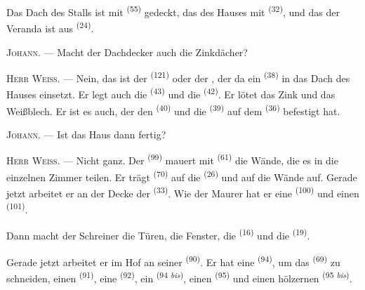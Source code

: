 
Das Dach des Stalls ist mit  \textsuperscript{(55)} gedeckt, das des
Hauses mit  \textsuperscript{(32)}, und das der Veranda ist aus
 \textsuperscript{(24)}.

\textsc{Johann}. --- Macht der Dachdecker auch die Zinkdächer?

\textsc{Herr Weiß}. --- Nein, das ist der 
\textsuperscript{(121)} oder der , der da ein
 \textsuperscript{(38)} in das Dach des Hauses einsetzt. Er legt
auch die  \textsuperscript{(43)} und die 
\textsuperscript{(42)}. Er lötet das Zink und das Weißblech. Er ist es auch, der den
 \textsuperscript{(40)} und die 
\textsuperscript{(39)} auf dem  \textsuperscript{(36)} befestigt hat.

\textsc{Johann}. --- Ist das Haus dann fertig?

\VUsaut{3.0mm}
\VUsaut{3.0mm}

\textsc{Herr Weiß}. --- Nicht ganz. Der  \textsuperscript{(99)} mauert
mit  \textsuperscript{(61)} die Wände, die es in die einzelnen
Zimmer teilen. Er trägt  \textsuperscript{(70)} auf die
 \textsuperscript{(26)} und auf die Wände auf. Gerade jetzt arbeitet
er an der Decke der  \textsuperscript{(33)}. Wie der Maurer hat er
eine  \textsuperscript{(100)} und einen 
\textsuperscript{(101)}.

Dann macht der Schreiner die Türen, die Fenster, die 
\textsuperscript{(16)} und die  \textsuperscript{(19)}.

Gerade jetzt arbeitet er im Hof an seiner 
\textsuperscript{(90)}. Er hat eine  \textsuperscript{(94)}, um das
 \textsuperscript{(69)} zu schneiden, einen 
\textsuperscript{(91)}, eine  \textsuperscript{(92)}, ein
 \textsuperscript{(94 \textit{bis})}, einen 
\textsuperscript{(95)} und einen hölzernen 
\textsuperscript{(95 \textit{bis})}.

